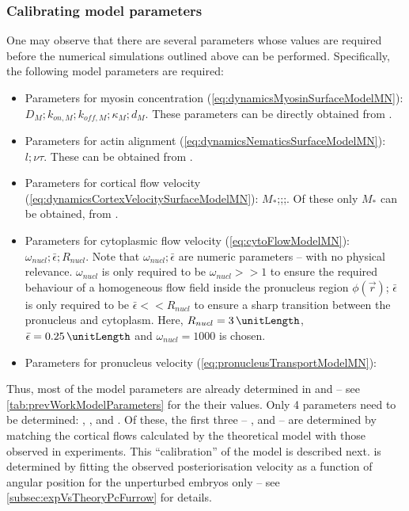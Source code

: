 \subsubsection{Calibrating model parameters}
One may observe that there are several parameters whose values are required before the numerical simulations outlined above can be performed. Specifically, the following model parameters are required: 
\begin{itemize}
    \item Parameters for myosin concentration (\autoref{eq:dynamicsMyosinSurfaceModelMN}): $D_M; k_{on,M}; k_{off,M}; \kappa_M; d_M$. These parameters can be directly obtained from \cite{gross2019guiding}.
    \item Parameters for actin alignment (\autoref{eq:dynamicsNematicsSurfaceModelMN}): $l;\nu\tau$. These can be obtained from \cite{reymann2016cortical}.
    \item Parameters for cortical flow velocity (\autoref{eq:dynamicsCortexVelocitySurfaceModelMN}): $M_*$;\hydrodynamicLength;\nematicLength;\activeRelaxLength. Of these only $M_*$ can be obtained, from \cite{gross2019guiding}.
    \item Parameters for cytoplasmic flow velocity (\autoref{eq:cytoFlowModelMN}): $\omega_{nucl}; \bar{\epsilon}; R_{nucl}$. Note that $\omega_{nucl}; \bar{\epsilon}$ are numeric parameters -- with no physical relevance. $\omega_{nucl}$ is only required to be $\omega_{nucl} >> 1$ to ensure the required behaviour of a homogeneous flow field inside the pronucleus region $\phi(\vec{r})$; $\bar{\epsilon}$ is only required to be $\bar{\epsilon} << R_{nucl}$ to ensure a sharp transition between the pronucleus and cytoplasm. Here, $R_{nucl} = \SI{3}{\unitLength}$, $\bar{\epsilon} = \SI{0.25}{\unitLength}$ and $\omega_{nucl} = \num{1000}$ is chosen.
    \item Parameters for pronucleus velocity (\autoref{eq:pronucleusTransportModelMN}): \dragCoefficient
\end{itemize}
Thus, most of the model parameters are already determined in \citep{gross2019guiding} and \citep{reymann2016cortical} -- see \autoref{tab:prevWorkModelParameters} for the their values. Only \num{4} parameters need to be determined: \hydrodynamicLength, \nematicLength, \activeRelaxLength and \dragCoefficient. Of these, the first three -- \hydrodynamicLength, \nematicLength and \activeRelaxLength -- are determined by matching the cortical flows calculated by the theoretical model with those observed in experiments. This \enquote{calibration} of the model is described next. \dragCoefficient is determined by fitting the observed posteriorisation velocity as a function of angular position for the unperturbed embryos only -- see \autoref{subsec:expVsTheoryPcFurrow} for details.

